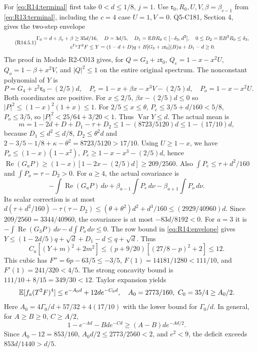 For \eqref{eq:R14:terminal} first take $0<d\le1/8$, $j=1$.
Use $\mathfrak r_0,\allowbreak R_0,\allowbreak U,\allowbreak V,\allowbreak \beta=\beta_{c-1}$ from
\eqref{eq:R13:terminal}, including the $c=4$ case $U=1,V=0$.
Q5-C181, Section 4, gives the two-step envelope
\begin{equation}\tag{R14.5.1}\label{eq:R14:envelope}
\begin{gathered}
\Gamma_0=d+\beta_c+\beta\ge35d/16,\quad D=3d/5,
\quad D_1=\mathbb E BR_0\in[-\delta_3,d^2],\quad
0\le D_2=\mathbb E B^2R_0\le\delta_3,\\
e^{\Gamma_0}T^2F\le
Y=(1-d+D)q+B[G_3+z\mathfrak r_0](B)u+D_1-d\ge0.
\end{gathered}
\end{equation}
The proof in Module R2-C013 gives, for
$Q=G_3+z\mathfrak r_0$,
$Q_e=1-x-x^2U$, $Q_o=1-\beta+x^2V$, and $|Q|^2\le1$
on the entire original spectrum. The nonconstant polynomial of $Y$ is
\[
P=G_4+z^2\mathfrak r_0-(2/5)d,\quad
P_e=1-x+\beta x-x^3V-(2/5)d,\quad P_o=1-x-x^2U.
\]
Both coordinates are positive. For $x\le2/5$,
$\beta x-(2/5)d\le0$ so $|P|^2\le(1-x)^2(1+x)\le1$.
For $2/5\le x\le\theta$,
$P_e\le3/5+d/160<5/8$, $P_o\le3/5$, so
$|P|^2<25/64+3/20<1$. Thus $\operatorname{Var}Y\le d$.
The actual mean is
\[
m=1-2d+D+D_1-\tau+D_2
\le1-(8723/5120)d\le1-(17/10)d,
\]
because $D_1\le d^2\le d/8$, $D_2\le\theta^2d$ and
$2-3/5-1/8+\kappa-\theta^2=8723/5120>17/10$.
Using $U\ge1-x$, we have $P_o\le(1-x)(1-x^2)$,
$P_e\ge1-x-x^3-(2/5)d$, hence
$\operatorname{Re}(G_aP)\ge(1-x)[1-2x-(2/5)d]\ge209/2560$.
Also $\int P_e\le\tau+d^2/160$ and
$\int P_o=\tau-D_2>0$.
For $a\ge4$, the actual covariance is
\[
-\int\operatorname{Re}(G_aP)\,d\nu
+\beta_{a-1}\int P_e\,d\nu-\beta_{a+1}\int P_o\,d\nu.
\]
Its scalar correction is at most
$d(\tau+d^2/160)-\tau(\tau-D_2)
\le(\theta+\theta^2)d^2+d^3/160\le(2929/40960)d$.
Since $209/2560=3344/40960$, the covariance is at most
$-83d/8192<0$. For $a=3$ it is
$-\int\operatorname{Re}(G_3P)\,\allowbreak d\nu-d\int P_o\,\allowbreak d\nu\le0$.
The row bound in \eqref{eq:R14:envelope} gives
$Y\le(1-2d/5)q+\sqrt d+D_1-d\le q+\sqrt d$.
Thus
\[
C_a[(Y+m)^2+2m^2]\le(p+9/20)[(27/8-p)^2+2]\le12.
\]
This cubic has $F''=6p-63/5\le-3/5$,
$F(1)=14181/1280<111/10$, and $F'(1)=241/320<4/5$.
The strong concavity bound is $111/10+8/15=349/30<12$.
Taylor expansion yields
\[
\mathbb E[f_a(T^2F)^4]\le e^{-A_0d}+12de^{-C_0d},
\quad A_0=2773/160,\ C_0=35/4\ge A_0/2.
\]
Here $A_0=4\Gamma_0/d+57/32+4(17/10)$ with the lower bound for
$\Gamma_0/d$. In general, for $A\ge B\ge0$, $C\ge A/2$,
\begin{equation}\tag{R14.7.3}\label{eq:R14:exponential}
1-e^{-Ad}-Bde^{-Cd}\ge(A-B)de^{-Ad/2}.
\end{equation}
Since $A_0-12=853/160$, $A_0d/2\le2773/2560<2$, and $e^2<9$,
the deficit exceeds $853d/1440>d/5$.

